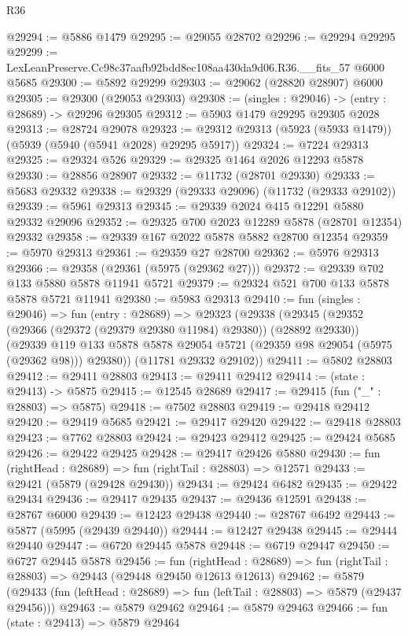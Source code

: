 \begin{lexlean}{R36}
\begin{coremodule}
@29294 := @5886 @1479
@29295 := @29055 @28702
@29296 := @29294 @29295
@29299 := LexLeanPreserve.Cc98c37aafb92bdd8ec108aa430da9d06.R36.__fits_57 @6000 @5685
@29300 := @5892 @29299
@29303 := @29062 (@28820 @28907) @6000
@29305 := @29300 (@29053 @29303)
@29308 := (singles : @29046) -> (entry : @28689) -> @29296 @29305
@29312 := @5903 @1479 @29295 @29305 @2028
@29313 := @28724 @29078
@29323 := @29312 @29313 (@5923 (@5933 @1479)) (@5939 (@5940 (@5941 @2028) @29295 @5917))
@29324 := @7224 @29313
@29325 := @29324 @526
@29329 := @29325 @1464 @2026 @12293 @5878
@29330 := @28856 @28907
@29332 := @11732 (@28701 @29330)
@29333 := @5683 @29332
@29338 := @29329 (@29333 @29096) (@11732 (@29333 @29102))
@29339 := @5961 @29313
@29345 := @29339 @2024 @415 @12291 @5880 @29332 @29096
@29352 := @29325 @700 @2023 @12289 @5878 (@28701 @12354) @29332
@29358 := @29339 @167 @2022 @5878 @5882 @28700 @12354
@29359 := @5970 @29313
@29361 := @29359 @27 @28700
@29362 := @5976 @29313
@29366 := @29358 (@29361 (@5975 (@29362 @27)))
@29372 := @29339 @702 @133 @5880 @5878 @11941 @5721
@29379 := @29324 @521 @700 @133 @5878 @5878 @5721 @11941
@29380 := @5983 @29313
@29410 := fun (singles : @29046) =>
  fun (entry : @28689) =>
  @29323
    (@29338
      (@29345
        (@29352 (@29366 (@29372 (@29379 @29380 @11984) @29380)) (@28892 @29330))
        (@29339 @119 @133 @5878 @5878 @29054 @5721 (@29359 @98 @29054 (@5975 (@29362 @98))) @29380))
      (@11781 @29332 @29102))
@29411 := @5802 @28803
@29412 := @29411 @28803
@29413 := @29411 @29412
@29414 := (state : @29413) -> @5875
@29415 := @12545 @28689
@29417 := @29415 (fun ("_" : @28803) => @5875)
@29418 := @7502 @28803
@29419 := @29418 @29412
@29420 := @29419 @5685
@29421 := @29417 @29420
@29422 := @29418 @28803
@29423 := @7762 @28803
@29424 := @29423 @29412
@29425 := @29424 @5685
@29426 := @29422 @29425
@29428 := @29417 @29426 @5880
@29430 := fun (rightHead : @28689) => fun (rightTail : @28803) => @12571
@29433 := @29421 (@5879 (@29428 @29430))
@29434 := @29424 @6482
@29435 := @29422 @29434
@29436 := @29417 @29435
@29437 := @29436 @12591
@29438 := @28767 @6000
@29439 := @12423 @29438
@29440 := @28767 @6492
@29443 := @5877 (@5995 (@29439 @29440))
@29444 := @12427 @29438
@29445 := @29444 @29440
@29447 := @6720 @29445 @5878
@29448 := @6719 @29447
@29450 := @6727 @29445 @5878
@29456 := fun (rightHead : @28689) =>
  fun (rightTail : @28803) => @29443 (@29448 @29450 @12613 @12613)
@29462 := @5879
    (@29433 (fun (leftHead : @28689) => fun (leftTail : @28803) => @5879 (@29437 @29456)))
@29463 := @5879 @29462
@29464 := @5879 @29463
@29466 := fun (state : @29413) => @5879 @29464

\end{coremodule}
\end{lexlean}
